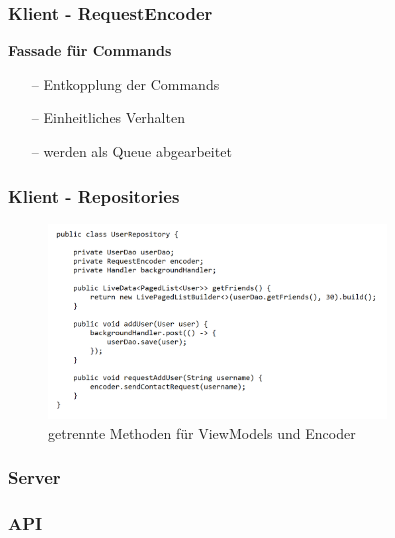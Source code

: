 \documentclass[aspectratio=1610]{beamer}
\begin{document}
	\begin{frame}[plain]
	\frametitle{Klient - RequestEncoder}
	\textbf{Fassade für Commands}
	\begin{itemize}
		\setlength\itemsep{0.3em}
		\item[--] Entkopplung der Commands
		\item[--] Einheitliches Verhalten
		\item[--] werden als Queue abgearbeitet
 	\end{itemize}
	\end{frame}

	\begin{frame}[plain]
	\frametitle{Klient - Repositories}
	\begin{figure}[h]
		\centering
		\includegraphics[width=0.8\textwidth]{images/UserRepository.PNG}
		\caption{getrennte Methoden für ViewModels und Encoder}
	\end{figure}
	\end{frame}

	\begin{frame}[plain]
		\frametitle{Server}

	\end{frame}

	\begin{frame}[plain]
		\frametitle{API}

	\end{frame}
\end{document}
